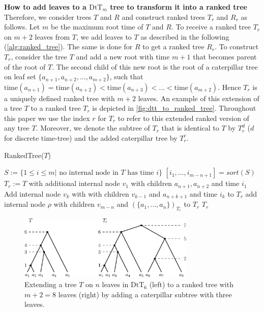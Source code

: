 \documentclass[11pt]{amsart}
\newcommand{\ntime}{\mathrm{time}}
\newcommand{\dtt}{\mathrm{DtT}}
\newcommand{\summary}[1]{\textbf{#1}} %
\begin{document}
\summary{How to add leaves to a $\dtt_m$ tree to transform it into a ranked tree}
Therefore, we consider trees $T$ and $R$ and construct ranked trees $T_r$ and $R_r$ as follows.
Let $m$ be the maximum root time of $T$ and $R$.
To receive a ranked tree $T_r$ on $m+2$ leaves from $T$, we add leaves to $T$ as described in the following (\autoref{alg:ranked_tree}).
The same is done for $R$ to get a ranked tree $R_r$.
To construct $T_r$, consider the tree $T$ and add a new root with time $m + 1$ that becomes parent of the root of $T$.
The second child of this new root is the root of a caterpillar tree on leaf set $\{a_{n+1}, a_{n+2}, \ldots, a_{m+2}\}$, such that $\ntime(a_{n+1}) = \ntime(a_{n+2}) < \ntime(a_{n+3}) < \ldots < \ntime(a_{m+2})$.
Hence $T_r$ is a uniquely defined ranked tree with $m+2$ leaves.
An example of this extension of a tree $T$ to a ranked tree $T_r$ is depicted in \autoref{fig:dtt_to_ranked_tree}.
Throughout this paper we use the index $r$ for $T_r$ to refer to this extended ranked version of any tree $T$.
Moreover, we denote the subtree of $T_r$ that is identical to $T$ by $T_r^d$ ($d$ for discrete time-tree) and the added caterpillar tree by $T_r^c$.

\begin{algorithm}[ht]
	\caption{RankedTree($T$)}
	\label{alg:ranked_tree}
	\begin{algorithmic}[1]
		\STATE $S:= \{1 \leq i \leq m | \text{ no internal node in } T \text{ has time } i\}$
		\STATE $[i_1, \ldots, i_{m-n+1}] = sort(S)$
		\STATE $T_r := T$ with additional internal node $v_1$ with children $a_{n+1}, a_{n+2}$ and time $i_1$
			\STATE Add internal node $v_k$ with with children $v_{k-1}$ and $a_{n+k+1}$ and time $i_k$ to $T_r$
		\STATE add internal node $\rho$ with children $v_{m-n}$ and $(\{a_1, \ldots, a_n\})_{T_r}$ to $T_r$
		\ENDFOR
		\RETURN $T_r$
	\end{algorithmic}
\end{algorithm}

\begin{figure}[ht]
	\includegraphics[width=0.75\textwidth]{dtt_to_ranked_tree.eps}
	\caption{Extending a tree $T$ on $n$ leaves in $\dtt_6$ (left) to a ranked tree with $m+2=8$ leaves (right) by adding a caterpillar subtree with three leaves.}
	\label{fig:dtt_to_ranked_tree}
\end{figure}
\end{document}
